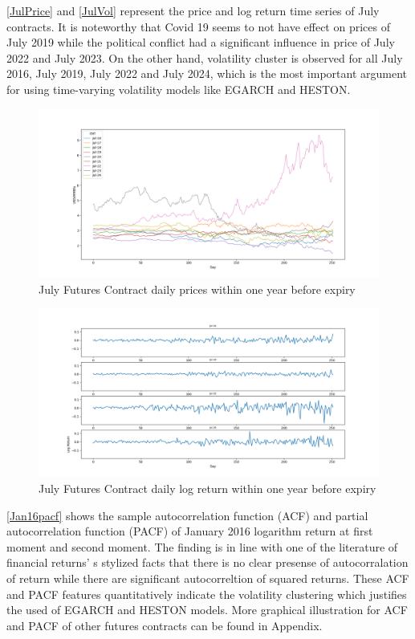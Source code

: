 \documentclass[12pt,a4paper]{article}
\newcommand\colorAutoref[1]{{\hypersetup{linkcolor=black}\autoref{#1}}}
\numberwithin{equation}{section}
\begin{document}
\colorAutoref{JulPrice} and \colorAutoref{JulVol} represent the price and log return time series of July contracts. It is noteworthy that Covid 19 seems to not have effect on prices of July 2019 while the political conflict had a significant influence in price of July 2022 and July 2023. On the other hand, volatility cluster is observed for all July 2016, July 2019, July 2022 and July 2024, which is the most important argument for using time-varying volatility models like EGARCH and HESTON.

\begin{figure}[h!] 
\includegraphics[scale=1,width=1\linewidth,height=0.4\textheight]{Jul_price.png}
\caption{July Futures Contract daily prices within one year before expiry}
\label{JulPrice}
\end{figure}
\begin{figure}[h!] 
\includegraphics[scale=1,width=1\linewidth,height=0.4\textheight]{Jul_vol.png}
\caption{July Futures Contract daily log return within one year before expiry}
\label{JulVol}
\end{figure}

\colorAutoref{Jan16pacf} shows the sample autocorrelation function (ACF) and partial autocorrelation function (PACF) of January 2016 logarithm return at first moment and second moment. The finding is in line with one of the literature of financial returns' s stylized facts that there is no clear presense of autocorralation of return while there are significant autocorreltion of squared returns. These ACF and PACF features quantitatively indicate the volatility clustering which justifies the used of EGARCH and HESTON models. More graphical illustration for ACF and PACF of other futures contracts can be found in Appendix.
\end{document}
